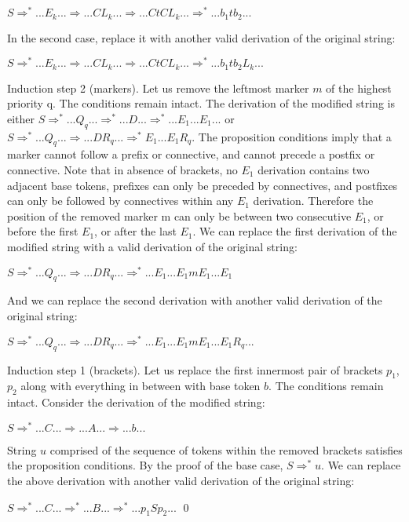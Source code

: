 \documentclass{llncs}
\begin{document}
\noindent
$S \Rightarrow^* ... E_k ... \Rightarrow ... C L_k ... \Rightarrow ... C t C L_k ... \Rightarrow^* ... b_1 t b_2 ...$

In the second case, replace it with another valid derivation of the original string:

\noindent
$S \Rightarrow^* ... E_k ... \Rightarrow ... C L_k ... \Rightarrow ... C t C L_k ... \Rightarrow^* ... b_1 t b_2 L_k ...$

Induction step 2 (markers). Let us remove the leftmost marker $m$ of the highest priority q. The conditions remain intact. The derivation of the modified string is either $S \Rightarrow^* ... Q_q ... \Rightarrow^* ... D ... \Rightarrow^* ... E_1 ... E_1 ...$ or $S \Rightarrow^* ... Q_q ... \Rightarrow ... D R_q ... \Rightarrow^* E_1 ... E_1 R_q$.
The proposition conditions imply that a marker cannot follow a prefix or connective, and cannot precede a postfix or connective. Note that in absence of brackets, no $E_1$ derivation contains two adjacent base tokens, prefixes can only be preceded by connectives, and postfixes can only be followed by connectives within any $E_1$ derivation. Therefore the position of the removed marker m can only be between two consecutive $E_1$, or before the first $E_1$, or after the last $E_1$. We can replace the first derivation of the modified string with a valid derivation of the original string:

\noindent
$S \Rightarrow^* ... Q_q ... \Rightarrow ... D R_q ... \Rightarrow^* ... E_1 ... E_1 m E_1 ... E_1$

And we can replace the second derivation with another valid derivation of the original string:

\noindent
$S \Rightarrow^* ... Q_q ... \Rightarrow ... D R_q ... \Rightarrow^* ... E_1 ... E_1 m E_1 ... E_1 R_q ...$

Induction step 1 (brackets). Let us replace the first innermost pair of brackets $p_1$, $p_2$ along with everything in between with base token $b$. The conditions remain intact. Consider the derivation of the modified string: 

\noindent
$S \Rightarrow^* ... C ... \Rightarrow ... A ... \Rightarrow ... b ...$

String $u$ comprised of the sequence of tokens within the removed brackets satisfies the proposition conditions. By the proof of the base case, $S \Rightarrow^* u$. We can replace the above derivation with another valid derivation of the original string:

\noindent
$S \Rightarrow^* ... C ... \Rightarrow^* ... B ... \Rightarrow^* ... p_1 S p_2 ...$
\qed
\end{document}
